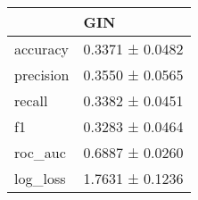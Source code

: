 \begin{tabular}{ll}
\toprule
 & GIN \\
\midrule
accuracy & 0.3371 ± 0.0482 \\
precision & 0.3550 ± 0.0565 \\
recall & 0.3382 ± 0.0451 \\
f1 & 0.3283 ± 0.0464 \\
roc_auc & 0.6887 ± 0.0260 \\
log_loss & 1.7631 ± 0.1236 \\
\bottomrule
\end{tabular}
